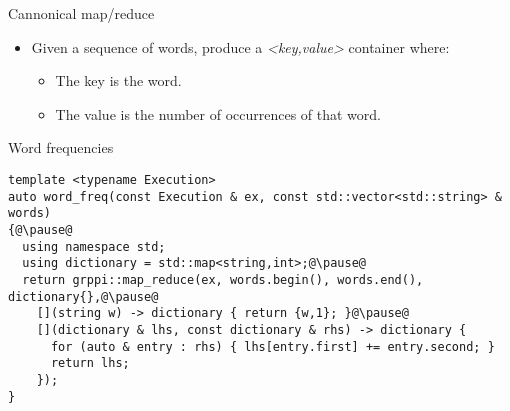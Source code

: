 \begin{frame}[t,fragile]{Cannonical map/reduce}
\begin{itemize}
  \item Given a sequence of words, produce a \emph{<key,value>} container where:
    \begin{itemize}
      \item The key is the word.
      \item The value is the number of occurrences of that word.
    \end{itemize}
\end{itemize}
\vfill\pause
\begin{block}{Word frequencies}
\begin{lstlisting}[escapechar=@]
template <typename Execution>
auto word_freq(const Execution & ex, const std::vector<std::string> & words)
{@\pause@
  using namespace std;
  using dictionary = std::map<string,int>;@\pause@
  return grppi::map_reduce(ex, words.begin(), words.end(), dictionary{},@\pause@
    [](string w) -> dictionary { return {w,1}; }@\pause@
    [](dictionary & lhs, const dictionary & rhs) -> dictionary {
      for (auto & entry : rhs) { lhs[entry.first] += entry.second; }
      return lhs;
    });
}
\end{lstlisting}
\end{block}
\end{frame}
